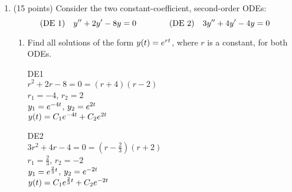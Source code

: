 \documentclass{article}
\begin{document}
\begin{enumerate}
\begin{enumerate}
\end{enumerate}


\bigskip
\item (15 points) Consider the two constant-coefficient, second-order ODEs:
\[
\hbox{(DE 1)}\quad y\sp{\prime\prime}+2y\sp\prime-8y=0\qquad\qquad\hbox{(DE 2)}\quad 3y\sp{\prime\prime}+4y\sp\prime-4y=0
\]
\begin{enumerate}
\item Find all solutions of the form $y(t)=e\sp{rt}$, where $r$ is a constant, for both ODEs.
\\
\begin{minipage}{0.45\textwidth}
DE1
\\$r^2+2r-8=0=(r+4)(r-2)$
\\$r_1=-4$, $r_2=2$
\\$y_1=e\sp{-4t}$, $y_2=e\sp{2t}$
\\$y(t)=C_1e\sp{-4t}+C_2e\sp{2t}$
\end{minipage}
\hfill
\begin{minipage}{0.45\textwidth}
DE2
\\$3r^2+4r-4=0=(r-\frac{2}{3})(r+2)$
\\$r_1=\frac{2}{3}$, $r_2=-2$
\\$y_1=e\sp{\frac{2}{3}t}$, $y_2=e\sp{-2t}$
\\$y(t)=C_1e\sp{\frac{2}{3}t}+C_2e\sp{-2t}$
\end{minipage}
\\


\end{enumerate}
\end{enumerate}
\end{document}
